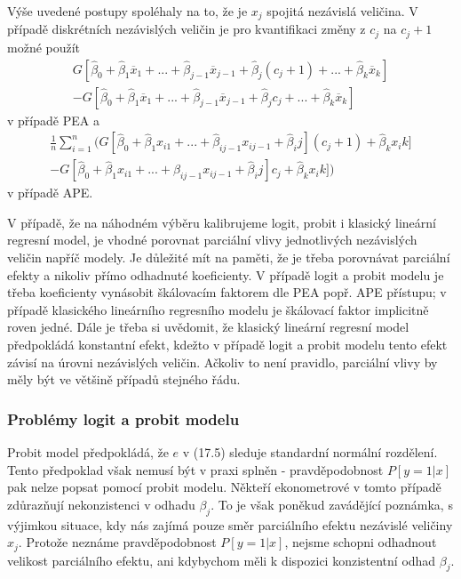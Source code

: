 Výše uvedené postupy spoléhaly na to, že je $x_j$ spojitá nezávislá veličina. V případě diskrétních nezávislých veličin je pro kvantifikaci změny z $c_j$ na $c_j + 1$ možné použít 
\begin{multline}
G[\hat{\beta}_0 + \hat{\beta}_1 \overline{x}_1 + ... + \hat{\beta}_{j - 1} \overline{x}_{j - 1} + \hat{\beta}_j (c_j + 1) + ... + \hat{\beta}_k \overline{x}_k]\\
- G[\hat{\beta}_0 + \hat{\beta}_1 \overline{x}_1 + ... + \hat{\beta}_{j - 1} \overline{x}_{j - 1} + \hat{\beta}_j c_j + ... + \hat{\beta}_k \overline{x}_k]
\end{multline}
v případě PEA a
\begin{multline}
\frac{1}{n}\sum_{i = 1}^n \Big(G[\hat{\beta}_0 + \hat{\beta}_1 x_{i1} + ... + \hat{\beta}_{ij - 1} x_{ij - 1} + \hat{\beta}_ij] (c_j + 1) + \hat{\beta}_k x_ik]\\
- G[\hat{\beta}_0 + \hat{\beta}_1 x_{i1} + ... + \hat{\beta}_{ij - 1} x_{ij - 1} + \hat{\beta}_ij] c_j + \hat{\beta}_k x_ik] \Big)
\end{multline}
v případě APE.

V případě, že na náhodném výběru kalibrujeme logit, probit i klasický lineární regresní model, je vhodné porovnat parciální vlivy jednotlivých nezávislých veličin napříč modely. Je důležité mít na paměti, že je třeba porovnávat parciální efekty a nikoliv přímo odhadnuté koeficienty. V případě logit a probit modelu je třeba koeficienty vynásobit škálovacím faktorem dle PEA popř. APE přístupu; v případě klasického lineárního regresního modelu je škálovací faktor implicitně roven jedné. Dále je třeba si uvědomit, že klasický lineární regresní model předpokládá konstantní efekt, kdežto v případě logit a probit modelu tento efekt závisí na úrovni nezávislých veličin. Ačkoliv to není pravidlo, parciální vlivy by měly být ve většině případů stejného řádu.

\subsubsection{Problémy logit a probit modelu}

Probit model předpokládá, že $e$ v (17.5) sleduje standardní normální rozdělení. Tento předpoklad však nemusí být v praxi splněn - pravděpodobnost $P[y=1|x]$ pak nelze popsat pomocí probit modelu. Někteří ekonometrové v tomto případě zdůrazňují nekonzistenci v odhadu $\beta_j$. To je však poněkud zavádějící poznámka, s výjimkou situace, kdy nás zajímá pouze směr parciálního efektu nezávislé veličiny $x_j$. Protože neznáme pravděpodobnost $P[y=1|x]$, nejsme schopni odhadnout velikost parciálního efektu, ani kdybychom měli k dispozici konzistentní odhad $\beta_j$.

